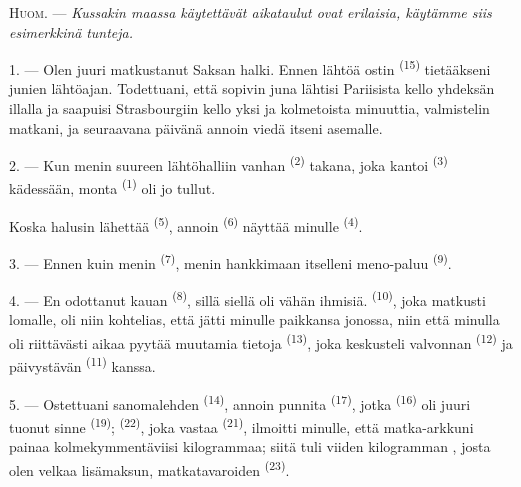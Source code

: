 
\VUsaut{4.0mm}
\VUsaut{2.4mm}
\VUsaut{3.4mm}
\textsc{Huom.} --- \textit{Kussakin maassa käytettävät aikataulut ovat erilaisia,
käytämme siis esimerkkinä}  \textit{tunteja.}

1. --- Olen juuri matkustanut Saksan halki. Ennen lähtöä ostin
 \textsuperscript{(15)} tietääkseni junien lähtöajan.
Todettuani, että sopivin juna lähtisi Pariisista kello yhdeksän illalla ja
saapuisi Strasbourgiin kello yksi ja kolmetoista minuuttia, valmistelin matkani,
ja seuraavana päivänä annoin viedä itseni asemalle.

2. --- Kun menin suureen lähtöhalliin vanhan 
\textsuperscript{(2)} takana, joka kantoi 
\textsuperscript{(3)} kädessään, monta 
\textsuperscript{(1)} oli jo tullut.

Koska halusin lähettää  \textsuperscript{(5)}, annoin
 \textsuperscript{(6)} näyttää minulle
 \textsuperscript{(4)}.

3. --- Ennen kuin menin  \textsuperscript{(7)}, menin
hankkimaan itselleni meno-paluu \textsuperscript{(9)}.

4. --- En odottanut kauan  \textsuperscript{(8)}, sillä siellä
oli vähän ihmisiä.  \textsuperscript{(10)}, joka matkusti
lomalle, oli niin kohtelias, että jätti minulle paikkansa jonossa, niin että
minulla oli riittävästi aikaa pyytää muutamia tietoja
 \textsuperscript{(13)}, joka keskusteli valvonnan
 \textsuperscript{(12)} ja päivystävän 
\textsuperscript{(11)} kanssa.

\VUsaut{3.0mm}

5. --- Ostettuani sanomalehden  \textsuperscript{(14)},
annoin punnita  \textsuperscript{(17)}, jotka
 \textsuperscript{(16)} oli juuri tuonut sinne
 \textsuperscript{(19)}; 
\textsuperscript{(22)}, joka vastaa  \textsuperscript{(21)},
ilmoitti minulle, että matka-arkkuni painaa kolmekymmentäviisi kilogrammaa; siitä
tuli viiden kilogramman , josta olen velkaa lisämaksun,
matkatavaroiden  \textsuperscript{(23)}.

